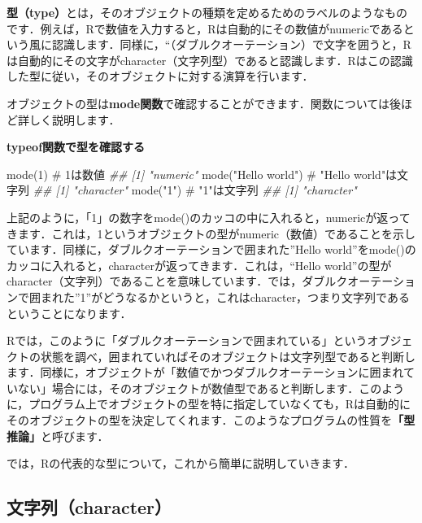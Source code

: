 \documentclass[
  letterpaper,
  DIV=11,
  numbers=noendperiod]{scrreprt}
\newenvironment{Shaded}{\begin{snugshade}}{\end{snugshade}}
\newcommand{\CommentTok}[1]{\textcolor[rgb]{0.37,0.37,0.37}{#1}}
\newcommand{\DecValTok}[1]{\textcolor[rgb]{0.68,0.00,0.00}{#1}}
\newcommand{\DocumentationTok}[1]{\textcolor[rgb]{0.37,0.37,0.37}{\textit{#1}}}
\newcommand{\FunctionTok}[1]{\textcolor[rgb]{0.28,0.35,0.67}{#1}}
\newcommand{\NormalTok}[1]{\textcolor[rgb]{0.00,0.23,0.31}{#1}}
\newcommand{\StringTok}[1]{\textcolor[rgb]{0.13,0.47,0.30}{#1}}
\begin{document}
\textbf{型（type）}とは，そのオブジェクトの種類を定めるためのラベルのようなものです．例えば，Rで数値を入力すると，Rは自動的にその数値がnumericであるという風に認識します．同様に，``（ダブルクオーテーション）で文字を囲うと，Rは自動的にその文字がcharacter（文字列型）であると認識します．Rはこの認識した型に従い，そのオブジェクトに対する演算を行います．

オブジェクトの型は\textbf{mode関数}で確認することができます．関数については後ほど詳しく説明します．

\textbf{typeof関数で型を確認する}

\begin{Shaded}
\begin{Highlighting}[]
\FunctionTok{mode}\NormalTok{(}\DecValTok{1}\NormalTok{) }\CommentTok{\# 1は数値}
\DocumentationTok{\#\# [1] "numeric"}
\FunctionTok{mode}\NormalTok{(}\StringTok{"Hello world"}\NormalTok{) }\CommentTok{\# "Hello world"は文字列}
\DocumentationTok{\#\# [1] "character"}
\FunctionTok{mode}\NormalTok{(}\StringTok{"1"}\NormalTok{) }\CommentTok{\# "1"は文字列}
\DocumentationTok{\#\# [1] "character"}
\end{Highlighting}
\end{Shaded}

上記のように，「1」の数字をmode()のカッコの中に入れると，numericが返ってきます．これは，1というオブジェクトの型がnumeric（数値）であることを示しています．同様に，ダブルクオーテーションで囲まれた''Hello
world''をmode()のカッコに入れると，characterが返ってきます．これは，``Hello
world''の型がcharacter（文字列）であることを意味しています．では，ダブルクオーテーションで囲まれた''1''がどうなるかというと，これはcharacter，つまり文字列であるということになります．

Rでは，このように「ダブルクオーテーションで囲まれている」というオブジェクトの状態を調べ，囲まれていればそのオブジェクトは文字列型であると判断します．同様に，オブジェクトが「数値でかつダブルクオーテーションに囲まれていない」場合には，そのオブジェクトが数値型であると判断します．このように，プログラム上でオブジェクトの型を特に指定していなくても，Rは自動的にそのオブジェクトの型を決定してくれます．このようなプログラムの性質を\textbf{「型推論」}と呼びます．

では，Rの代表的な型について，これから簡単に説明していきます．

\hypertarget{ux6587ux5b57ux5217character}{%
\subsection{文字列（character）}\label{ux6587ux5b57ux5217character}}
\end{document}
